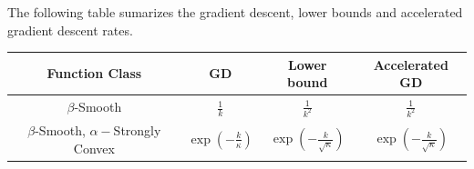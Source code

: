 The following table sumarizes the gradient descent, lower bounds and accelerated gradient descent rates. 

\begin{center}


 \begin{tabular}{||c c c c ||} 
 \hline
 Function Class   & GD  & Lower bound & Accelerated GD \\ [0.5ex] 
 \hline\hline
 $\beta$-Smooth & $\frac{1}{k}$ &  $\frac{1}{k^2}$ &  $\frac{1}{k^2}$\\ [1ex]
 \hline
 $\beta$-Smooth, $\alpha-$Strongly Convex  &  $\exp\left(-\frac{k}{\kappa}\right)$ &  $\exp\left(-\frac{k}{\sqrt{\kappa}}  \right)$ &  $\exp\left(-\frac{k}{\sqrt{\kappa}}  \right)$ \\ [1ex]
 \hline
\end{tabular}



\end{center}
